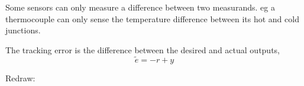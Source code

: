  
Some sensors can only measure a difference between two measurands. eg  a thermocouple can only sense the temperature difference between its hot and cold junctions.
\begin{center}
\end{center}
\ifslidesonly
\begin{slide}
The tracking error is the difference between the desired and actual outputs,
\[
\tilde e =  - r + y
\]
   \begin{center}
   \end{center}
\end{slide}
\fi
Redraw:
\begin{center}
\end{center}
